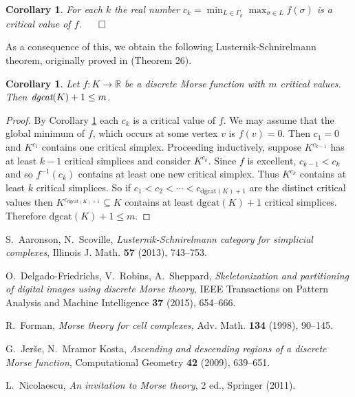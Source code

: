 \documentclass[11pt]{amsart}
\newtheorem{cor}[theorem]{Corollary}
\theoremstyle{definition}
\newcommand{\zr}{{\mathbb R}}
\begin{document}
\begin{cor}\label{minmaxcor}
For each $k$ the real number $\displaystyle c_k=\min_{L\in\Gamma_k}\max_{\sigma\in L}f(\sigma)$ is a critical value of $f$. \hfill $\qed$
\end{cor}

As a consequence of this, we obtain the following Lusternik-Schnirelmann theorem, originally proved in \cite{scoville} (Theorem 26).

\begin{cor}\label{lusternikthm}
Let $f:K\to\zr$ be a discrete Morse function with $m$ critical values. Then $\text{\em dgcat}(K)+1\le m$.
\end{cor}

\begin{proof}
By Corollary \ref{minmaxcor} each $c_k$ is a critical value of $f$. We may assume that the global minimum of $f$, which occurs at some vertex $v$ is $f(v)=0$. Then $c_1=0$ and $K^{c_1}$ contains one critical simplex. Proceeding inductively, suppose $K^{c_{k-1}}$ has at least $k-1$ critical simplices and consider $K^{c_k}$. Since $f$ is excellent, $c_{k-1}<c_k$ and so $f^{-1}(c_k)$ contains at least one new critical simplex. Thus $K^{c_k}$ contains at least $k$ critical simplices. So if $c_1<c_2<\cdots <c_{\text{dgcat}(K)+1}$ are the distinct critical values then $K^{c_{\text{dgcat}(K)+1}}\subseteq K$ contains at least $\text{dgcat}(K)+1$ critical simplices. Therefore $\text{dgcat}(K)+1\le m$.
\end{proof}




 \begin{thebibliography}{99}

 S.~Aaronson, N.~Scoville, {\em Lusternik-Schnirelmann category for simplicial complexes}, Illinois J. Math. {\bf 57} (2013), 743--753.

 O.~Delgado-Friedrichs, V.~Robins, A.~Sheppard, {\em Skeletonization and partitioning of digital images using discrete Morse theory}, IEEE Transactions on Pattern Analysis and Machine Intelligence {\bf 37} (2015), 654--666.

 R.~Forman, {\em Morse theory for cell complexes}, Adv. Math. {\bf 134} (1998), 90--145.

 G.~Jer\v{s}e, N.~Mramor Kosta, {\em Ascending and descending regions of a discrete Morse function}, Computational Geometry {\bf 42} (2009), 639--651.

 L.~Nicolaescu, {\em An invitation to Morse theory}, 2 ed., Springer (2011).


\end{thebibliography}
\end{document}
